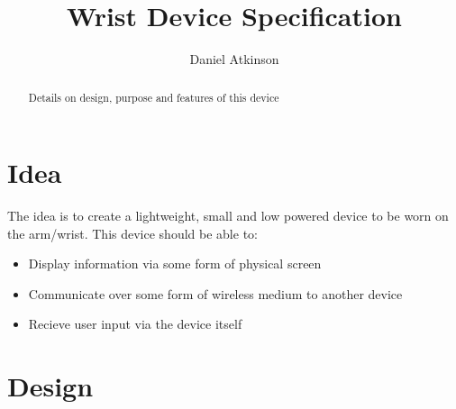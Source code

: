 \documentclass{article}
\begin{document}
\title{Wrist Device Specification}

\author{Daniel Atkinson}

\maketitle

\begin{abstract}

Details on design, purpose and features of this device

\end{abstract}


\section{Idea}
The idea is to create a lightweight, small and low powered device to be worn on the arm/wrist.
This device should be able to:
\begin{itemize}
\item Display information via some form of physical screen
\item Communicate over some form of wireless medium to another device
\item Recieve user input via the device itself
\end{itemize}
\section{Design}



\end{document}
